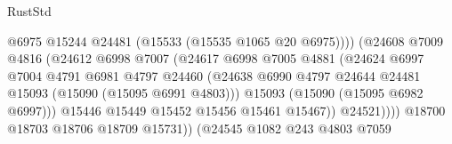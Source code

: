 \begin{lexlean}{RustStd}
\begin{coremodule}
                                                @6975
                                                @15244
                                                @24481
                                                (@15533 (@15535 @1065 @20 @6975))))
                                            (@24608
                                              @7009
                                              @4816
                                              (@24612
                                                @6998
                                                @7007
                                                (@24617
                                                  @6998
                                                  @7005
                                                  @4881
                                                  (@24624
                                                    @6997
                                                    @7004
                                                    @4791
                                                    @6981
                                                    @4797
                                                    @24460
                                                    (@24638
                                                      @6990
                                                      @4797
                                                      @24644
                                                      @24481
                                                      @15093
                                                      (@15090 (@15095 @6991 @4803)))
                                                    @15093
                                                    (@15090 (@15095 @6982 @6997)))
                                                  @15446
                                                  @15449
                                                  @15452
                                                  @15456
                                                  @15461
                                                  @15467))
                                              @24521))))
                                      @18700
                                      @18703
                                      @18706
                                      @18709
                                      @15731))
                                  (@24545
                                    @1082
                                    @243
                                    @4803
                                    @7059

\end{coremodule}
\end{lexlean}
